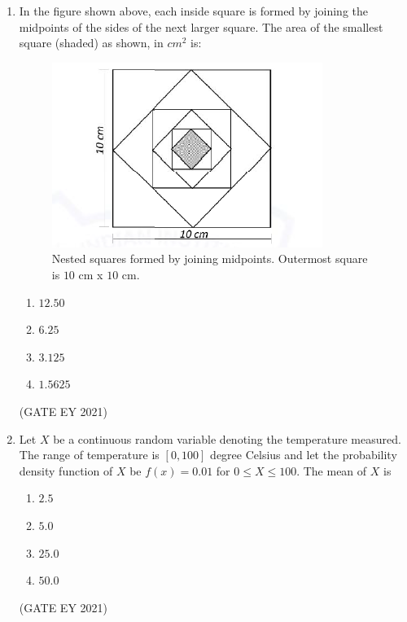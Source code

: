 \documentclass[journal]{IEEEtran}
\begin{document}
\begin{enumerate}
    \item In the figure shown above, each inside square is formed by joining the midpoints of the sides of the next larger square. The area of the smallest square (shaded) as shown, in $cm^{2}$ is:
    \begin{figure}[!h]
        \centering
        \includegraphics[width=0.2\columnwidth]{figs/Q.7.png}
        \caption{Nested squares formed by joining midpoints. Outermost square is $10$ cm x $10$ cm.}
        \label{Q.7}
    \end{figure}
    \begin{multicols}{2}
    \begin{enumerate}
        \item $12.50$
        \item $6.25$
        \item $3.125$
        \item $1.5625$
    \end{enumerate}
    \end{multicols}
    \hfill{(GATE EY 2021)}

    \item Let $X$ be a continuous random variable denoting the temperature measured. The range of temperature is $[0, 100]$ degree Celsius and let the probability density function of $X$ be $f(x)=0.01$ for $0 \le X \le 100$. The mean of $X$ is
    \begin{multicols}{2}
    \begin{enumerate}
        \item $2.5$
        \item $5.0$
        \item $25.0$
        \item $50.0$
    \end{enumerate}
    \end{multicols}
    \hfill{(GATE EY 2021)}


\end{enumerate}
\end{document}
